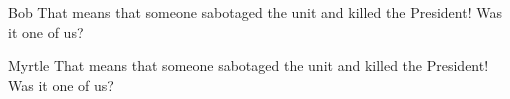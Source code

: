 \documentclass[12pt, a4paper, titlepage]{article}
\begin{document}



\pagebreak

\tableofcontents
\pagebreak

\begin{dialogue}{Bob}
That means that someone
sabotaged the unit and killed the
President! Was it one of us?
\end{dialogue}
\begin{dialogue}{Myrtle}
That means that someone
sabotaged the unit and killed the
President! Was it one of us?
\end{dialogue}





\end{document}
